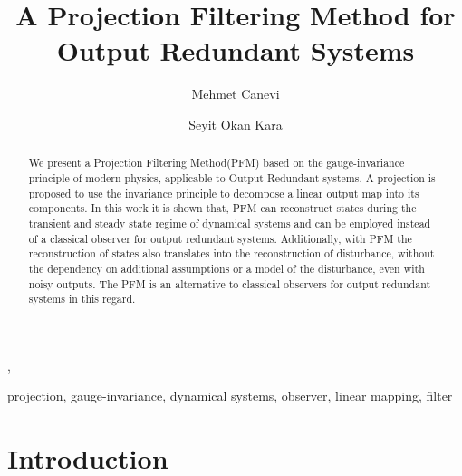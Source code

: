 \documentclass[twocolumn]{autart}    %
\begin{document}
\begin{frontmatter}

\title{A Projection Filtering Method for Output Redundant Systems} 


\author[canevi]{Mehmet Canevi},  
\author[kara]{Seyit Okan Kara}     

\address[canevi]{Electrical-Electronics Engineering Department, Engineering Faculty, Nigde Omer Halisdemir University, Nigde 51240, Turkey}                                     
\address[kara]{Bor Vocational School, Nigde Omer Halisdemir University, Nigde 51240, Turkey}                                             

          
\begin{keyword}                           %
projection, gauge-invariance, dynamical systems, observer, linear mapping, filter               %
\end{keyword}                             %

\begin{abstract}                          %
We present a Projection Filtering Method(PFM) based on the gauge-invariance principle of modern physics, applicable to Output Redundant systems. A projection is proposed to use the invariance principle to decompose a linear output map into its components. In this work it is shown that, PFM can reconstruct states during the transient and steady state regime of dynamical systems and can be employed instead of a classical observer for output redundant systems. Additionally, with PFM the reconstruction of states also translates into the reconstruction of disturbance, without the dependency on additional assumptions or a model of the disturbance, even with noisy outputs. The PFM is an alternative to classical observers for output redundant systems in this regard.
\end{abstract}
\end{frontmatter}

\section{Introduction}
\end{document}
